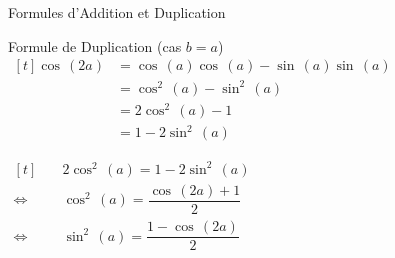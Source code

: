 \documentclass{cours}
\begin{document}
\begin{Gpartie}{Formules d'Addition et Duplication}
\begin{Spartie}{Formule de Duplication (cas $b=a$)}
            $\begin{aligned}[t]
                \cos\,(2a) &= \cos\,(a)\cos\,(a)-\sin\,(a)\sin\,(a) \\
                &=\cos^2\,(a)-\sin^2\,(a) \\
                &= 2\cos^2\,(a)-1 \\ 
                &= 1-2\sin^2\,(a)
            \end{aligned}$

            $\begin{aligned}[t]
                &\quad2\cos^2\,(a)=1-2\sin^2\,(a) \\
                \iff&\quad\cos^2\,(a)=\dfrac{\cos\,(2a)+1}{2} \\
                \iff&\quad\sin^2\,(a)=\dfrac{1-\cos\,(2a)}{2}
            \end{aligned}$
        \end{Spartie}
    \end{Gpartie}
    \pagebreak
\end{document}
